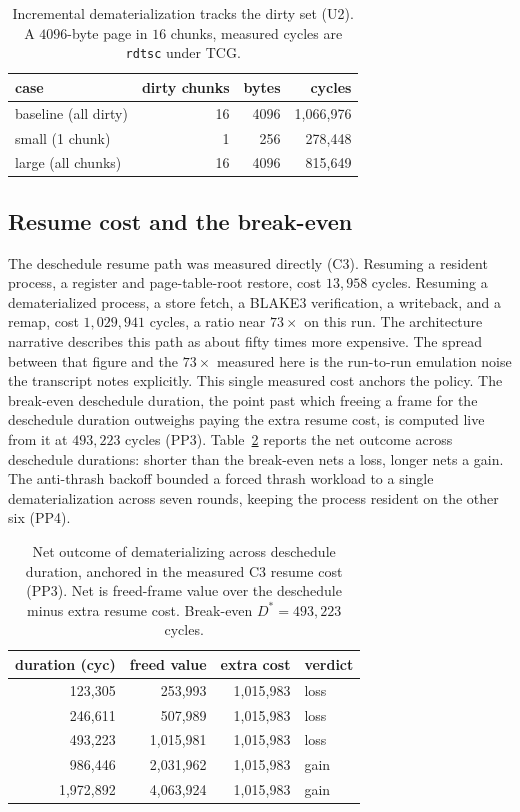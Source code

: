 \documentclass[10pt,twocolumn]{article}
\begin{document}
\begin{table}[t]
\centering
\caption{Incremental dematerialization tracks the dirty set (U2). A
$4096$-byte page in $16$ chunks, measured cycles are \texttt{rdtsc} under TCG.}
\label{tab:crossover}
\small
\begin{tabular}{lrrr}
\toprule
case & dirty chunks & bytes & cycles \\
\midrule
baseline (all dirty) & 16 & 4096 & 1{,}066{,}976 \\
small (1 chunk)      & 1  & 256  & 278{,}448 \\
large (all chunks)   & 16 & 4096 & 815{,}649 \\
\bottomrule
\end{tabular}
\end{table}

\subsection{Resume cost and the break-even}

The deschedule resume path was measured directly (C3). Resuming a resident
process, a register and page-table-root restore, cost $13{,}958$ cycles. Resuming
a dematerialized process, a store fetch, a BLAKE3 verification, a writeback, and a
remap, cost $1{,}029{,}941$ cycles, a ratio near $73\times$ on this run. The
architecture narrative describes this path as about fifty times more expensive.
The spread between that figure and the $73\times$ measured here is the run-to-run
emulation noise the transcript notes explicitly. This single measured cost anchors
the policy. The break-even deschedule duration, the point past which freeing a
frame for the deschedule duration outweighs paying the extra resume cost, is
computed live from it at $493{,}223$ cycles (PP3). Table~\ref{tab:breakeven}
reports the net outcome across deschedule durations: shorter than the break-even
nets a loss, longer nets a gain. The anti-thrash backoff bounded a forced thrash
workload to a single dematerialization across seven rounds, keeping the process
resident on the other six (PP4).

\begin{table}[t]
\centering
\caption{Net outcome of dematerializing across deschedule duration, anchored in
the measured C3 resume cost (PP3). Net is freed-frame value over the deschedule
minus extra resume cost. Break-even $D^\ast = 493{,}223$ cycles.}
\label{tab:breakeven}
\small
\begin{tabular}{rrrl}
\toprule
duration (cyc) & freed value & extra cost & verdict \\
\midrule
123{,}305   & 253{,}993   & 1{,}015{,}983 & loss \\
246{,}611   & 507{,}989   & 1{,}015{,}983 & loss \\
493{,}223   & 1{,}015{,}981 & 1{,}015{,}983 & loss \\
986{,}446   & 2{,}031{,}962 & 1{,}015{,}983 & gain \\
1{,}972{,}892 & 4{,}063{,}924 & 1{,}015{,}983 & gain \\
\bottomrule
\end{tabular}
\end{table}
\end{document}
